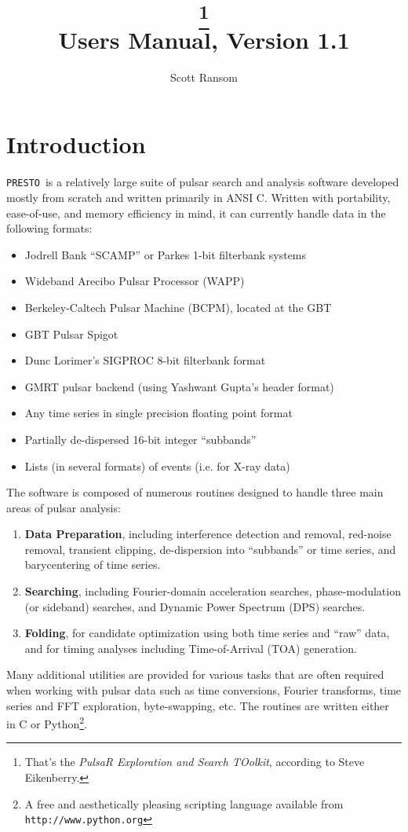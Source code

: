 \documentclass[11pt]{article}
\title{\huge \PRESTO\thanks{That's the \emph{PulsaR Exploration and
      Search TOolkit},
    according to Steve Eikenberry.}\\
  {\large Users Manual, Version 1.1}}
\author{Scott Ransom}
\newcommand{\PRESTO}{{\tt PRESTO}}
\begin{document}
\maketitle

\section{Introduction}

\PRESTO\ is a relatively large suite of pulsar search and analysis
software developed mostly from scratch and written primarily in ANSI
C.  Written with portability, ease-of-use, and memory efficiency in
mind, it can currently handle data in the following
formats:

\begin{itemize}
\item Jodrell Bank ``SCAMP'' or Parkes 1-bit filterbank systems 
\item Wideband Arecibo Pulsar Processor (WAPP)
\item Berkeley-Caltech Pulsar Machine (BCPM), located at the GBT
\item GBT Pulsar Spigot
\item Dunc Lorimer's SIGPROC 8-bit filterbank format
\item GMRT pulsar backend (using Yashwant Gupta's header format)
\item Any time series in single precision floating point format
\item Partially de-dispersed 16-bit integer ``subbands''
\item Lists (in several formats) of events (i.e. for X-ray data)
\end{itemize}

The software is composed of numerous routines designed to handle three
main areas of pulsar analysis:
\begin{enumerate}
\item {\bf Data Preparation}, including interference detection and
  removal, red-noise removal, transient clipping, de-dispersion into
  ``subbands'' or time series, and barycentering of time series.
\item {\bf Searching}, including Fourier-domain acceleration searches,
  phase-modulation (or sideband) searches, and Dynamic Power Spectrum
  (DPS) searches.
\item {\bf Folding}, for candidate optimization using both time series
  and ``raw'' data, and for timing analyses including Time-of-Arrival
  (TOA) generation.
\end{enumerate}
Many additional utilities are provided for various tasks that are
often required when working with pulsar data such as time conversions,
Fourier transforms, time series and FFT exploration, byte-swapping,
etc.  The routines are written either in C or Python\footnote{A free
  and aesthetically pleasing scripting language available from {\tt
    http://www.python.org}}.
\end{document}
